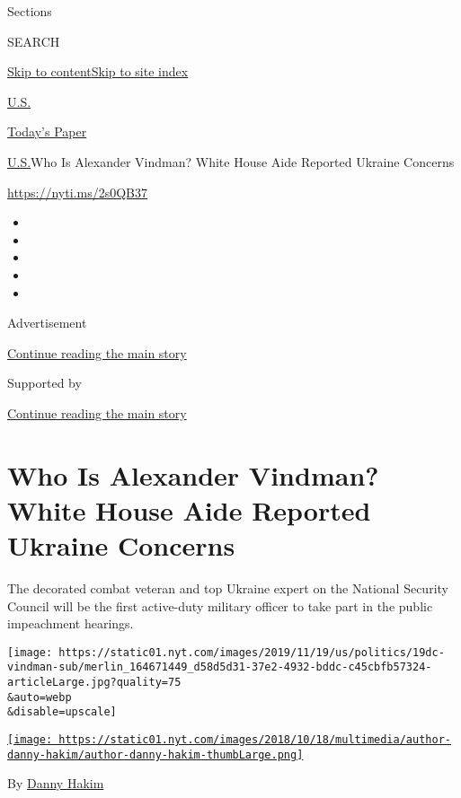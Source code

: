 Sections

SEARCH

\protect\hyperlink{site-content}{Skip to
content}\protect\hyperlink{site-index}{Skip to site index}

\href{https://www.nytimes.com/section/us}{U.S.}

\href{https://myaccount.nytimes.com/auth/login?response_type=cookie\&client_id=vi}{}

\href{https://www.nytimes.com/section/todayspaper}{Today's Paper}

\href{/section/us}{U.S.}\textbar{}Who Is Alexander Vindman? White House
Aide Reported Ukraine Concerns

\url{https://nyti.ms/2s0QB37}

\begin{itemize}
\item
\item
\item
\item
\item
\end{itemize}

Advertisement

\protect\hyperlink{after-top}{Continue reading the main story}

Supported by

\protect\hyperlink{after-sponsor}{Continue reading the main story}

\hypertarget{who-is-alexander-vindman-white-house-aide-reported-ukraine-concerns}{%
\section{Who Is Alexander Vindman? White House Aide Reported Ukraine
Concerns}\label{who-is-alexander-vindman-white-house-aide-reported-ukraine-concerns}}

The decorated combat veteran and top Ukraine expert on the National
Security Council will be the first active-duty military officer to take
part in the public impeachment hearings.

\texttt{[image: https://static01.nyt.com/images/2019/11/19/us/politics/19dc-vindman-sub/merlin\_164671449\_d58d5d31-37e2-4932-bddc-c45cbfb57324-articleLarge.jpg?quality=75\\\&auto=webp\\\&disable=upscale]}

\href{https://www.nytimes.com/by/danny-hakim}{\texttt{[image: https://static01.nyt.com/images/2018/10/18/multimedia/author-danny-hakim/author-danny-hakim-thumbLarge.png]}}

By \href{https://www.nytimes.com/by/danny-hakim}{Danny Hakim}


